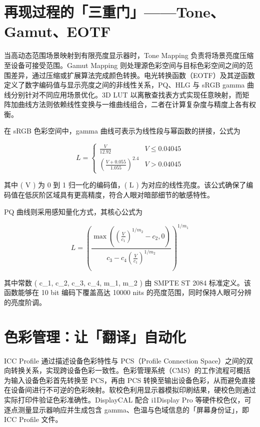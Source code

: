 \chapter{再现过程的「三重门」——Tone、Gamut、EOTF}
当高动态范围场景映射到有限亮度显示器时，Tone Mapping 负责将场景亮度压缩至设备可接受范围。Gamut Mapping 则处理源色彩空间与目标色彩空间之间的范围差异，通过压缩或扩展算法完成颜色转换。电光转换函数（EOTF）及其逆函数定义了数字编码值与显示亮度之间的非线性关系，PQ、HLG 与 sRGB gamma 曲线分别针对不同应用场景优化。3D LUT 以离散查找表方式实现任意映射，而矩阵加曲线方法则依赖线性变换与一维曲线组合，二者在计算复杂度与精度上各有权衡。\par
在 sRGB 色彩空间中，gamma 曲线可表示为线性段与幂函数的拼接，公式为\par
$$ L = \begin{cases} \frac{V}{12.92} & V \leq 0.04045 \\ \left( \frac{V + 0.055}{1.055} \right)^{2.4} & V > 0.04045 \end{cases} $$\par
其中 ( V ) 为 0 到 1 归一化的编码值，( L ) 为对应的线性亮度。该公式确保了编码值在低灰阶区域具有更高精度，符合人眼对暗部细节的敏感特性。\par
PQ 曲线则采用感知量化方式，其核心公式为\par
$$ L = \left( \frac{\max\left( \left( \frac{V}{c_1} \right)^{1/m_2} - c_2, 0 \right)}{c_3 - c_4 \left( \frac{V}{c_1} \right)^{1/m_2}} \right)^{1/m_1} $$\par
其中常数 ( c\_{}1, c\_{}2, c\_{}3, c\_{}4, m\_{}1, m\_{}2 ) 由 SMPTE ST 2084 标准定义。该函数能够在 10 bit 编码下覆盖高达 10000 nits 的亮度范围，同时保持人眼可分辨的亮度阶调。\par
\chapter{色彩管理：让「翻译」自动化}
ICC Profile 通过描述设备色彩特性与 PCS（Profile Connection Space）之间的双向转换关系，实现跨设备色彩一致性。色彩管理系统（CMS）的工作流程可概括为输入设备色彩首先转换至 PCS，再由 PCS 转换至输出设备色彩，从而避免直接在设备间进行不可逆的色彩映射。软校色利用显示器模拟印刷结果，硬校色则通过实际打印件验证色彩准确性。DisplayCAL 配合 i1Display Pro 等硬件校色仪，可逐点测量显示器响应并生成包含 gamma、色温与色域信息的「屏幕身份证」，即 ICC Profile 文件。\par
